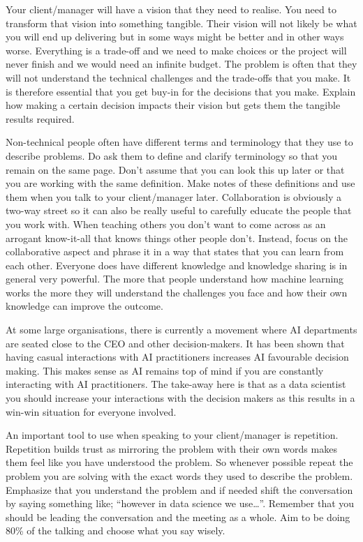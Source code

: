 \documentclass[
]{book}
\begin{document}
Your client/manager will have a vision that they need to realise. You need to transform that vision into something tangible. Their vision will not likely be what you will end up delivering but in some ways might be better and in other ways worse. Everything is a trade-off and we need to make choices or the project will never finish and we would need an infinite budget. The problem is often that they will not understand the technical challenges and the trade-offs that you make. It is therefore essential that you get buy-in for the decisions that you make. Explain how making a certain decision impacts their vision but gets them the tangible results required.

Non-technical people often have different terms and terminology that they use to describe problems. Do ask them to define and clarify terminology so that you remain on the same page. Don't assume that you can look this up later or that you are working with the same definition. Make notes of these definitions and use them when you talk to your client/manager later. Collaboration is obviously a two-way street so it can also be really useful to carefully educate the people that you work with. When teaching others you don't want to come across as an arrogant know-it-all that knows things other people don't. Instead, focus on the collaborative aspect and phrase it in a way that states that you can learn from each other. Everyone does have different knowledge and knowledge sharing is in general very powerful. The more that people understand how machine learning works the more they will understand the challenges you face and how their own knowledge can improve the outcome.

At some large organisations, there is currently a movement where AI departments are seated close to the CEO and other decision-makers. It has been shown that having casual interactions with AI practitioners increases AI favourable decision making. This makes sense as AI remains top of mind if you are constantly interacting with AI practitioners. The take-away here is that as a data scientist you should increase your interactions with the decision makers as this results in a win-win situation for everyone involved.

An important tool to use when speaking to your client/manager is repetition. Repetition builds trust as mirroring the problem with their own words makes them feel like you have understood the problem. So whenever possible repeat the problem you are solving with the exact words they used to describe the problem. Emphasize that you understand the problem and if needed shift the conversation by saying something like; ``however in data science we use\ldots{}''. Remember that you should be leading the conversation and the meeting as a whole. Aim to be doing 80\% of the talking and choose what you say wisely.
\end{document}
